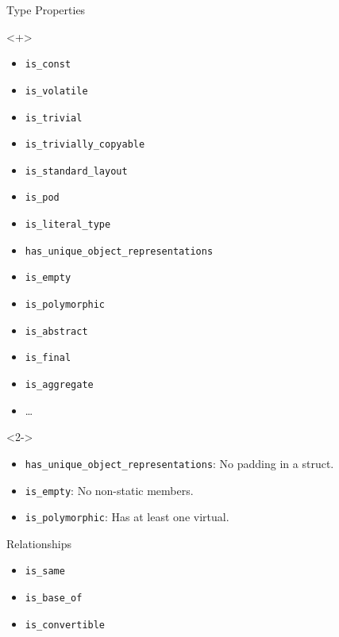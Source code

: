 \documentclass[table]{beamer}
\begin{document}
\begin{frame}{Type Properties}
  \begin{onlyenv}<+>
    \begin{itemize}
    \item \texttt{is\_const}
    \item \texttt{is\_volatile}
    \item \texttt{is\_trivial}
    \item \texttt{is\_trivially\_copyable}
    \item \texttt{is\_standard\_layout}
    \item \texttt{is\_pod}
    \item \texttt{is\_literal\_type}
    \item \texttt{has\_unique\_object\_representations}
    \item \texttt{is\_empty}
    \item \texttt{is\_polymorphic}
    \item \texttt{is\_abstract}
    \item \texttt{is\_final}
    \item \texttt{is\_aggregate}
    \item \ldots
    \end{itemize}
  \end{onlyenv}

  \begin{onlyenv}<2->
    \begin{itemize}
    \item<+-> \texttt{has\_unique\_object\_representations}: No padding in a
      struct.
    \item<+-> \texttt{is\_empty}: No non-static members.
    \item<+-> \texttt{is\_polymorphic}: Has at least one virtual.
    \end{itemize}
  \end{onlyenv}
\end{frame}

\begin{frame}{Relationships}
  \begin{itemize}
  \item \texttt{is\_same}
  \item \texttt{is\_base\_of}
  \item \texttt{is\_convertible}
  \end{itemize}
\end{frame}
\end{document}
